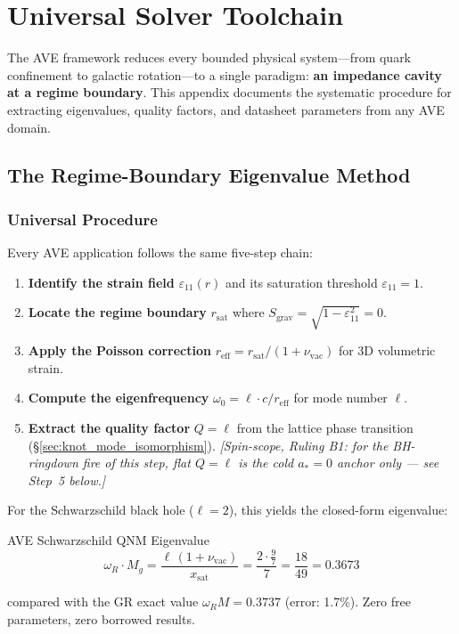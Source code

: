 \chapter{Universal Solver Toolchain}
\label{app:solver_toolchain}

The AVE framework reduces every bounded physical system---from quark confinement to galactic rotation---to a single paradigm: \textbf{an impedance cavity at a regime boundary}. This appendix documents the systematic procedure for extracting eigenvalues, quality factors, and datasheet parameters from any AVE domain.

\section{The Regime-Boundary Eigenvalue Method}
\label{sec:regime_eigenvalue}

\subsection{Universal Procedure}

Every AVE application follows the same five-step chain:

\begin{enumerate}
    \item \textbf{Identify the strain field} $\varepsilon_{11}(r)$ and its saturation threshold $\varepsilon_{11} = 1$.
    \item \textbf{Locate the regime boundary} $r_\mathrm{sat}$ where $S_\mathrm{grav} = \sqrt{1 - \varepsilon_{11}^2} = 0$.
    \item \textbf{Apply the Poisson correction} $r_\mathrm{eff} = r_\mathrm{sat} / (1 + \nu_\mathrm{vac})$ for 3D volumetric strain.
    \item \textbf{Compute the eigenfrequency} $\omega_0 = \ell \cdot c / r_\mathrm{eff}$ for mode number $\ell$.
    \item \textbf{Extract the quality factor} $Q = \ell$ from the lattice phase transition (\S\ref{sec:knot_mode_isomorphism}).  \emph{[Spin-scope, Ruling B1: for the BH-ringdown fire of this step, flat $Q = \ell$ is the cold $a_* = 0$ anchor only --- see Step~5 below.]}
\end{enumerate}

\noindent For the Schwarzschild black hole ($\ell = 2$), this yields the closed-form eigenvalue:
\begin{resultbox}{AVE Schwarzschild QNM Eigenvalue}
\begin{equation}
    \boxed{\omega_R \cdot M_g = \frac{\ell \, (1 + \nu_\mathrm{vac})}{x_\mathrm{sat}}
    = \frac{2 \cdot \tfrac{9}{7}}{7} = \frac{18}{49} = 0.3673}
    \label{eq:ave_qnm_eigenvalue}
\end{equation}
\end{resultbox}
\noindent compared with the GR exact value $\omega_R M = 0.3737$ (error: 1.7\%).
Zero free parameters, zero borrowed results.


